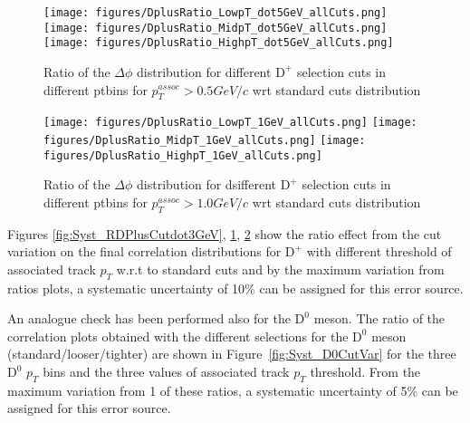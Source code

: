\begin{figure}[h]
\centering
{\texttt{[image: figures/DplusRatio\_LowpT\_dot5GeV\_allCuts.png]}}
{\texttt{[image: figures/DplusRatio\_MidpT\_dot5GeV\_allCuts.png]}}
{\texttt{[image: figures/DplusRatio\_HighpT\_dot5GeV\_allCuts.png]}}
 \caption{Ratio of the $\Delta\phi$ distribution for different $\text{D}^+$ selection cuts in different ptbins for $p_{T}^{assoc}>0.5 GeV/c$  wrt standard cuts distribution }
\label{fig:Syst_RDPlusCutdot5GeV}
\end{figure}

\begin{figure}[h]
\centering
{\texttt{[image: figures/DplusRatio\_LowpT\_1GeV\_allCuts.png]}}
{\texttt{[image: figures/DplusRatio\_MidpT\_1GeV\_allCuts.png]}}
{\texttt{[image: figures/DplusRatio\_HighpT\_1GeV\_allCuts.png]}}
\caption{Ratio of the $\Delta\phi$ distribution for dsifferent $\text{D}^+$ selection cuts in different ptbins for $p_{T}^{assoc}>1.0 GeV/c$ wrt standard cuts distribution }
\label{fig:Syst_RDPlusCut1GeV}
\end{figure}

Figures \ref{fig:Syst_RDPlusCutdot3GeV}, \ref{fig:Syst_RDPlusCutdot5GeV}, \ref{fig:Syst_RDPlusCut1GeV} show the ratio effect from the cut variation on the final correlation distributions for $\text{D}^+$ with different threshold of associated track $p_{T}$ w.r.t to standard cuts and by the maximum variation from ratios plots, a systematic uncertainty of 10\% can be assigned for this error source.


An analogue check has been performed also for the $\text{D}^0$ meson. The ratio of the correlation plots obtained with the different selections for the $\text{D}^0$ meson (standard/looser/tighter) are shown in Figure~\ref{fig:Syst_D0CutVar} for the three $\text{D}^0$ $p_{T}$ bins and the three values of associated track $p_{T}$ threshold. From the maximum variation from 1 of these ratios, a systematic uncertainty of 5\% can be assigned for this error source.

